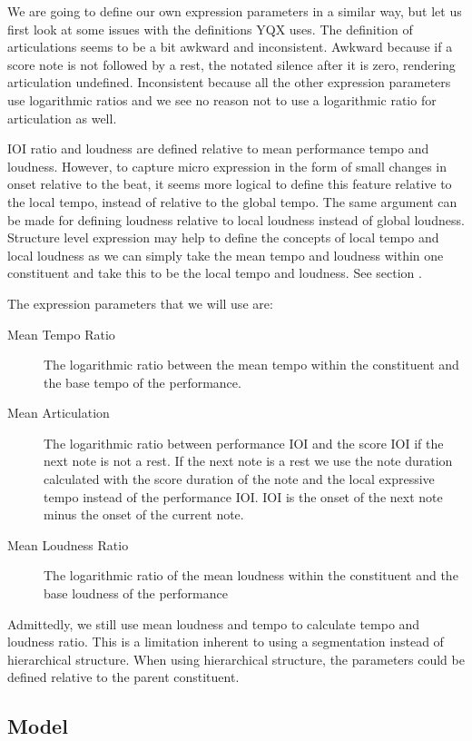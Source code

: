 \documentclass[a4paper,10pt]{article}
\begin{document}
We are going to define our own expression parameters in a similar way, but let us first look at some issues with the definitions YQX uses. The definition of articulations seems to be a bit awkward and inconsistent. Awkward because if a score note is not followed by a rest, the notated silence after it is zero, rendering articulation undefined. Inconsistent because all the other expression parameters use logarithmic ratios and we see no reason not to use a logarithmic ratio for articulation as well. 

IOI ratio and loudness are defined relative to mean performance tempo and loudness. However, to capture micro expression in the form of small changes in onset relative to the beat, it seems more logical to define this feature relative to the local tempo, instead of relative to the global tempo. The same argument can be made for defining loudness relative to local loudness instead of global loudness. Structure level expression may help to define the concepts of local tempo and local loudness as we can simply take the mean tempo and loudness within one constituent and take this to be the local tempo and loudness. See section .

The expression parameters that we will use are:
\begin{description}
\item[Mean Tempo Ratio] The logarithmic ratio between the mean tempo within the constituent and the base tempo of the performance.
\item[Mean Articulation] The logarithmic ratio between performance IOI and the score IOI if the next note is not a rest. If the next note is a rest we use the note duration calculated with the score duration of the note and the local expressive tempo instead of the performance IOI. IOI is the onset of the next note minus the onset of the current note.
\item[Mean Loudness Ratio] The logarithmic ratio of the mean loudness within the constituent and the base loudness of the performance
\end{description}

Admittedly, we still use mean loudness and tempo to calculate tempo and loudness ratio. This is a limitation inherent to using a segmentation instead of hierarchical structure. When using hierarchical structure, the parameters could be defined relative to the parent constituent.

\subsection{Model}
\label{sec:model}
\end{document}
